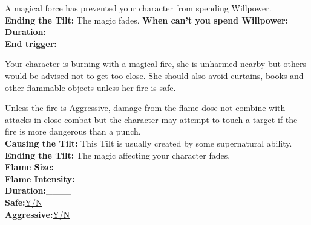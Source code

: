 \documentclass[10pt, frontgrid, backgrid]{flacards}
\begin{document}
{A magical force has prevented your character from spending Willpower. \\
\textbf{Ending the Tilt:} The magic fades.
\textbf{When can't you spend Willpower:} \fillunderline \\
\textbf{Duration:} \_\_\_\_ \\
\textbf{End trigger:}\fillunderline}

{Your character is burning with a magical fire, she is unharmed nearby but others would be advised not to get too close. She should also avoid curtains, books and other flammable objects unless her fire is safe. 

Unless the fire is Aggressive, damage from the flame dose not combine with attacks in close combat but the character may attempt to touch a target if the fire is more dangerous than a punch.\\
\textbf{Causing the Tilt:} This Tilt is usually created by some supernatural ability. \\
\textbf{Ending the Tilt:} The magic affecting your character fades. \\
\textbf{Flame Size:}\_\_\_\_\_\_\_\_\_\_\_\_ \\
\textbf{Flame Intensity:}\_\_\_\_\_\_\_\_\_\_\_\_ \\
\textbf{Duration:}\_\_\_\_\\
\textbf{Safe:}\underline{Y/N}\\
\textbf{Aggressive:}\underline{Y/N}}
\end{document}
